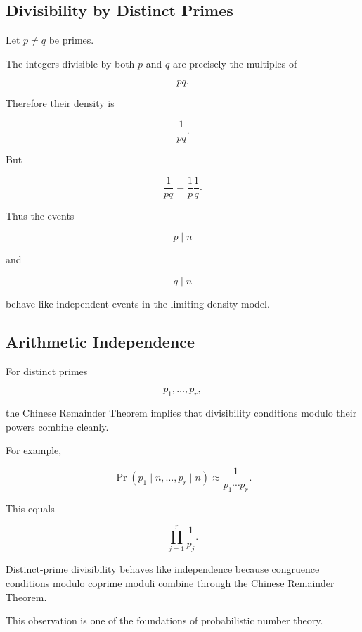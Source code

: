 \subsection{Divisibility by Distinct Primes}
\label{subsec:distinct-prime-divisibility}

Let \(p\neq q\) be primes.

The integers divisible by both \(p\) and \(q\) are precisely the multiples of

\[ pq. \]

Therefore their density is

\[ \frac1{pq}. \]

But

\[ \frac1{pq}=\frac1p\frac1q. \]

Thus the events

\[ p\mid n \]

and

\[ q\mid n \]

behave like independent events in the limiting density model.

\subsection{Arithmetic Independence}
\label{subsec:arithmetic-independence}

For distinct primes

\[ p_1,\ldots,p_r, \]

the Chinese Remainder Theorem implies that divisibility conditions modulo
their powers combine cleanly.

For example,

\[
\Pr(p_1\mid n,\ldots,p_r\mid n)
\approx
\frac1{p_1\cdots p_r}.
\]

This equals

\[ \prod_{j=1}^{r}\frac1{p_j}. \]

\begin{conceptbox}
Distinct-prime divisibility behaves like independence because congruence
conditions modulo coprime moduli combine through the Chinese Remainder
Theorem.
\end{conceptbox}

This observation is one of the foundations of probabilistic number theory.

